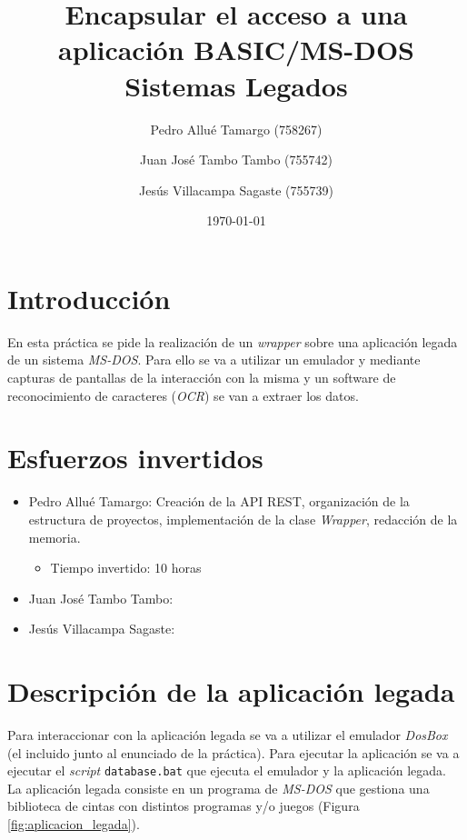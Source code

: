 \documentclass[10pt,a4paper]{article}
\begin{document}
\begin{titlepage}
\title{\textbf{
	{\Huge Encapsular el acceso a una aplicación BASIC/MS-DOS}\\
	{\Large Sistemas Legados}
}}
\author{
	Pedro Allué Tamargo (758267)
	\and
	Juan José Tambo Tambo (755742)
	\and
	Jesús Villacampa Sagaste (755739)
}
\date{\today}
\clearpage\maketitle
\thispagestyle{empty}
\tableofcontents
\end{titlepage}


\section{Introducción}

En esta práctica se pide la realización de un \emph{wrapper} sobre una aplicación legada de un sistema \emph{MS-DOS}. Para ello se va a utilizar un emulador y mediante capturas de pantallas de la interacción con la misma y un software de reconocimiento de caracteres (\emph{OCR}) se van a extraer los datos.


\section{Esfuerzos invertidos}

\begin{itemize}
\item Pedro Allué Tamargo: Creación de la API REST, organización de la estructura de proyectos, implementación de la clase \emph{Wrapper}, redacción de la memoria.
	\begin{itemize}
	\item Tiempo invertido: 10 horas
	\end{itemize}
\item Juan José Tambo Tambo:
\item Jesús Villacampa Sagaste:
\end{itemize}

\section{Descripción de la aplicación legada}

Para interaccionar con la aplicación legada se va a utilizar el emulador \emph{DosBox} (el incluido junto al enunciado de la práctica). Para ejecutar la aplicación se va a ejecutar el \emph{script} \texttt{database.bat} que ejecuta el emulador y la aplicación legada.\\
La aplicación legada consiste en un programa de \emph{MS-DOS} que gestiona una biblioteca de cintas con distintos programas y/o juegos (Figura \ref{fig:aplicacion_legada}).
\end{document}
